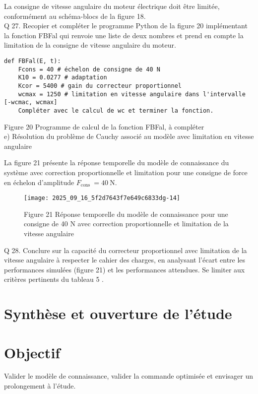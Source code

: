 La consigne de vitesse angulaire du moteur électrique doit être limitée, conformément au schéma-blocs de la figure 18.\\
Q 27. Recopier et compléter le programme Python de la figure 20 implémentant la fonction FBFal qui renvoie une liste de deux nombres et prend en compte la limitation de la consigne de vitesse angulaire du moteur.

\begin{verbatim}
def FBFal(E, t):
    Fcons = 40 # échelon de consigne de 40 N
    K10 = 0.0277 # adaptation
    Kcor = 5400 # gain du correcteur proportionnel
    wcmax = 1250 # limitation en vitesse angulaire dans l'intervalle [-wcmac, wcmax]
    Compléter avec le calcul de wc et terminer la fonction.
\end{verbatim}

Figure 20 Programme de calcul de la fonction FBFal, à compléter\\
e) Résolution du problème de Cauchy associé au modèle avec limitation en vitesse angulaire

La figure 21 présente la réponse temporelle du modèle de connaissance du système avec correction proportionnelle et limitation pour une consigne de force en échelon d'amplitude $F_{\text {cons }}=40 \mathrm{~N}$.

\begin{figure}[h]
\begin{center}
  \texttt{[image: 2025\_09\_16\_5f2d7643f7e649c6833dg-14]}
\captionsetup{labelformat=empty}
\caption{Figure 21 Réponse temporelle du modèle de connaissance pour une consigne de 40 N avec correction proportionnelle et limitation de la vitesse angulaire}
\end{center}
\end{figure}

Q 28. Conclure sur la capacité du correcteur proportionnel avec limitation de la vitesse angulaire à respecter le cahier des charges, en analysant l'écart entre les performances simulées (figure 21) et les performances attendues. Se limiter aux critères pertinents du tableau 5 .

\section{Synthèse et ouverture de l'étude}
\section{Objectif}
Valider le modèle de connaissance, valider la commande optimisée et envisager un prolongement à l'étude.

